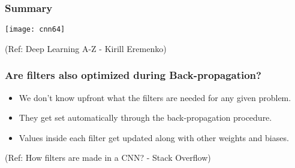 



\begin{frame}[fragile] \frametitle{Summary}

\begin{center}
\texttt{[image: cnn64]}

\tiny{(Ref: Deep Learning A-Z - Kirill Eremenko)}
\end{center}

\end{frame}

\begin{frame}[fragile] \frametitle{Are filters also optimized during Back-propagation?}

\begin{itemize}
\item  We don't know upfront what the filters are needed for any given problem. 
\item They get set automatically through the back-propagation procedure. 
\item Values inside each filter get updated along with other weights and biases.
\end{itemize}

\tiny{(Ref: How filters are made in a CNN? - Stack Overflow)}
\end{frame}




